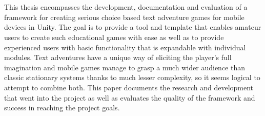\chapter{\abstractname}

This thesis encompasses the development, documentation and evaluation of a framework for creating serious choice based text adventure games for mobile devices in Unity. The goal is to provide a tool and template that enables amateur users to create such educational games with ease as well as to provide experienced users with basic functionality that is expandable with individual modules. Text adventures have a unique way of eliciting the player's full imagination and mobile games manage to grasp a much wider audience than classic stationary systems thanks to much lesser complexity, so it seems logical to attempt to combine both. This paper documents the research and development that went into the project as well as evaluates the quality of the framework and success in reaching the project goals. 